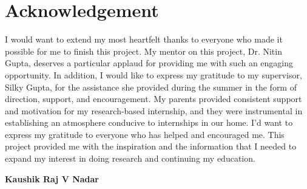 \section*{Acknowledgement}

\normalsize{
I would want to extend my most heartfelt thanks to everyone who made it possible for me to finish this project. My mentor on this project, Dr. Nitin Gupta, deserves a particular applaud for providing me with such an engaging opportunity.
In addition, I would like to express my gratitude to my supervisor, Silky Gupta, for the assistance she provided during the summer in the form of direction, support, and encouragement.
My parents provided consistent support and motivation for my research-based internship, and they were instrumental in establishing an atmosphere conducive to internships in our home. I'd want to express my gratitude to everyone who has helped and encouraged me.
This project provided me with the inspiration and the information that I needed to expand my interest in doing research and continuing my education.
}
\vspace{2.5cm}
\begin{flushright}
\textbf{Kaushik Raj V Nadar}\\
\end{flushright}